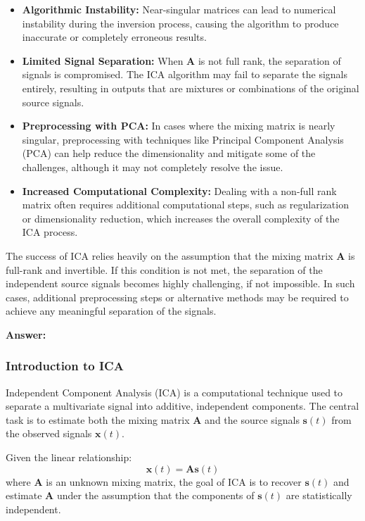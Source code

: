 \documentclass{exam}
\begin{document}
\begin{itemize}
    \item \textbf{Algorithmic Instability:} Near-singular matrices can lead to numerical instability during the inversion process, causing the algorithm to produce inaccurate or completely erroneous results.
    
    \item \textbf{Limited Signal Separation:} When \( \mathbf{A} \) is not full rank, the separation of signals is compromised. The ICA algorithm may fail to separate the signals entirely, resulting in outputs that are mixtures or combinations of the original source signals.
    
    \item \textbf{Preprocessing with PCA:} In cases where the mixing matrix is nearly singular, preprocessing with techniques like Principal Component Analysis (PCA) can help reduce the dimensionality and mitigate some of the challenges, although it may not completely resolve the issue.
    
    \item \textbf{Increased Computational Complexity:} Dealing with a non-full rank matrix often requires additional computational steps, such as regularization or dimensionality reduction, which increases the overall complexity of the ICA process.
\end{itemize}

The success of ICA relies heavily on the assumption that the mixing matrix \( \mathbf{A} \) is full-rank and invertible. If this condition is not met, the separation of the independent source signals becomes highly challenging, if not impossible. In such cases, additional preprocessing steps or alternative methods may be required to achieve any meaningful separation of the signals.


\textbf{Answer:}

\subsubsection{Introduction to ICA}

Independent Component Analysis (ICA) is a computational technique used to separate a multivariate signal into additive, independent components. The central task is to estimate both the mixing matrix \( \mathbf{A} \) and the source signals \( \mathbf{s}(t) \) from the observed signals \( \mathbf{x}(t) \).

Given the linear relationship:
\[
\mathbf{x}(t) = \mathbf{A} \mathbf{s}(t)
\]
where \( \mathbf{A} \) is an unknown mixing matrix, the goal of ICA is to recover \( \mathbf{s}(t) \) and estimate \( \mathbf{A} \) under the assumption that the components of \( \mathbf{s}(t) \) are statistically independent.
\end{document}
